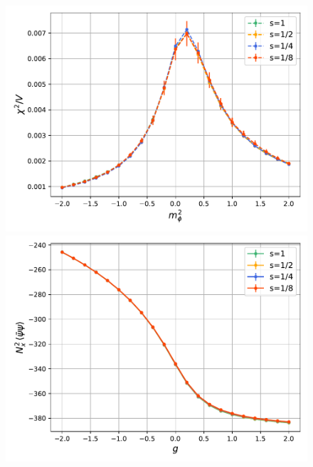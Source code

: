 \begin{figure}
    \begin{minipage}{0.45\textwidth}
        \includegraphics[scale=0.45]{figures/cooling/mass_scan/susceptibility.pdf}
    \end{minipage}
    \hfill 
    \begin{minipage}{0.45\textwidth}
        \includegraphics[scale=0.45]{figures/cooling/mass_scan/condensate.pdf}
    \end{minipage}
\end{figure}

